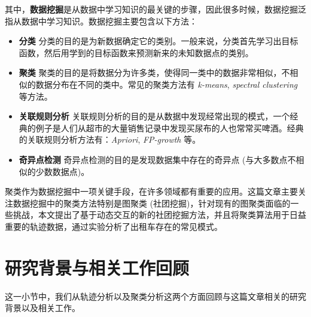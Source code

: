 \vspace{2mm}
其中，\textbf{数据挖掘}是从数据中学习知识的最关键的步骤，因此很多时候，数据挖掘泛指从数据中学习知识。数据挖掘主要包含以下方法：
\begin{itemize}
\item \hspace{2mm} \textbf{分类} 分类的目的是为新数据确定它的类别。一般来说，分类首先学习出目标函数，然后用学到的目标函数来预测新来的未知数据点的类别。
\item \hspace{2mm} \textbf{聚类} 聚类的目的是将数据分为许多类，使得同一类中的数据非常相似，不相似的数据分布在不同的类中。常见的聚类方法有 \emph{k-means}, \emph{spectral clustering} 等方法。 
\item \hspace{2mm} \textbf{关联规则分析} 关联规则分析的目的是从数据中发现经常出现的模式，一个经典的例子是人们从超市的大量销售记录中发现买尿布的人也常常买啤酒。经典的关联规则分析方法有：\emph{Apriori}, \emph{FP-growth} 等。
\item \hspace{2mm} \textbf{奇异点检测} 奇异点检测的目的是发现数据集中存在的奇异点 (与大多数点不相似的少数数据点)。
\end{itemize}
\vspace{2mm}

聚类作为数据挖掘中一项关键手段，在许多领域都有重要的应用。这篇文章主要关注数据挖掘中的聚类方法特别是图聚类 (社团挖掘)，针对现有的图聚类面临的一些挑战，本文提出了基于动态交互的新的社团挖掘方法，并且将聚类算法用于日益重要的轨迹数据，通过实验分析了出租车存在的常见模式。\par

\section{研究背景与相关工作回顾}
这一小节中，我们从轨迹分析以及聚类分析这两个方面回顾与这篇文章相关的研究背景以及相关工作。

